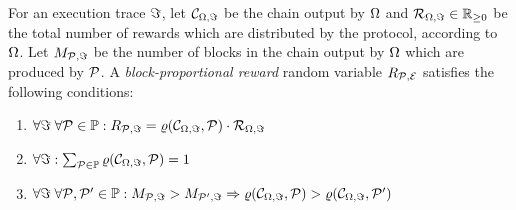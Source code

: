 \begin{definition}\label{def:proportional-rewards}
    For an execution trace $\Im$, let $\mathcal{C}_{\Omega,\Im}$ be the chain output by $\Omega$ and
    $\mathcal{R}_{\Omega,\Im} \in \mathbb{R}_{\geq 0}$ be the
    total number of rewards which are distributed by the protocol, according to
    $\Omega$. Let $M_{\mathcal{P},\Im}$ be the number of
blocks in the chain output by $\Omega$ which are produced by $\mathcal{P}$. A \emph{block-proportional reward} random variable $R_{\mathcal{P}, \mathcal{E}}$ satisfies the
    following conditions:
    \begin{enumerate}
        \item $\forall \Im \; \forall \mathcal{P} \in \mathbb{P}: R_{\mathcal{P}, \Im} = \varrho(\mathcal{C}_{\Omega,\Im}, \mathcal{P}) \cdot \mathcal{R}_{\Omega,\Im}$
        \item $\forall \Im: \sum_{\mathcal{P} \in \mathbb{P}} \varrho(\mathcal{C}_{\Omega,\Im}, \mathcal{P}) = 1$
        \item $\forall \Im \; \forall \mathcal{P}, \mathcal{P}' \in \mathbb{P}:M_{\mathcal{P},\Im}>M_{\mathcal{P}',\Im}\Rightarrow \varrho(\mathcal{C}_{\Omega,\Im}, \mathcal{P}) > \varrho(\mathcal{C}_{\Omega,\Im}, \mathcal{P}')$
    \end{enumerate}
\end{definition}
